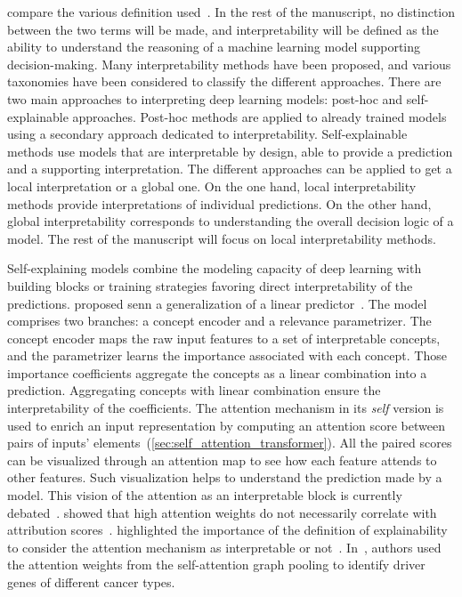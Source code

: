 \documentclass[../main.tex]{subfiles}
\begin{document}
	\citeauthor{clinciu-hastie-2019-survey} compare the various definition used~\cite{clinciu-hastie-2019-survey}.
	In the rest of the manuscript, no distinction between the two terms will be made, and interpretability will be defined as the ability to understand the reasoning of a machine learning model supporting decision-making.
	Many interpretability methods have been proposed, and various taxonomies have been considered to classify the different approaches.
	There are two main approaches to interpreting deep learning models: post-hoc and self-explainable approaches.
	Post-hoc methods are applied to already trained models using a secondary approach dedicated to interpretability.
	Self-explainable methods use models that are interpretable by design, \ie{}able to provide a prediction and a supporting interpretation.
	The different approaches can be applied to get a local interpretation or a global one.
	On the one hand, local interpretability methods provide interpretations of individual predictions.
	On the other hand, global interpretability corresponds to understanding the overall decision logic of a model.
	The rest of the manuscript will focus on local interpretability methods.

	Self-explaining models combine the modeling capacity of deep learning with building blocks or training strategies favoring direct interpretability of the predictions.
	\citeauthor{SENN} proposed \gls{senn} a generalization of a linear predictor~\cite{SENN}.
	The model comprises two branches: a concept encoder and a relevance parametrizer.
	The concept encoder maps the raw input features to a set of interpretable concepts, and the parametrizer learns the importance associated with each concept.
	Those importance coefficients aggregate the concepts as a linear combination into a prediction.
	Aggregating concepts with linear combination ensure the interpretability of the coefficients.
	The attention mechanism in its \emph{self} version is used to enrich an input representation by computing an attention score between pairs of inputs' elements~(\cref{sec:self_attention_transformer}).
	All the paired scores can be visualized through an attention map to see how each feature attends to other features.
	Such visualization helps to understand the prediction made by a model.
	This vision of the attention as an interpretable block is currently debated~\cite{jain-wallace-2019-attention,wiegreffe-pinter-2019-attention}.
	\citeauthor{jain-wallace-2019-attention} showed that high attention weights do not necessarily correlate with attribution scores~\cite{jain-wallace-2019-attention}.
	\citeauthor{wiegreffe-pinter-2019-attention} highlighted the importance of the definition of explainability to consider the attention mechanism as interpretable or not~\citeauthor{wiegreffe-pinter-2019-attention}.
	In~\cite{DeepMOCCA}, authors used the attention weights from the self-attention graph pooling to identify driver genes of different cancer types.
\end{document}
